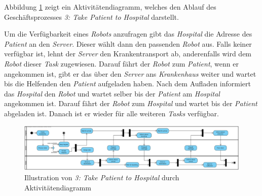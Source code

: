 			Abbildung \ref{fig:2-4-take-patient-to-hospital-aktivitaetendiagramm} zeigt ein Aktivitätendiagramm, welches den Ablauf des Geschäftsprozesses \emph{3: Take Patient to Hospital} darstellt.

			Um die Verfügbarkeit eines \emph{Robots} anzufragen gibt das \emph{Hospital} die Adresse des \emph{Patient} an den \emph{Server}. 
			Dieser wählt dann den passenden \emph{Robot} aus. 
			Falls keiner verfügbar ist, lehnt der \emph{Server} den Krankentransport ab, anderenfalls wird dem \emph{Robot} dieser \emph{Task} zugewiesen. 
			Darauf fährt der \emph{Robot} zum \emph{Patient}, wenn er angekommen ist, gibt er das über den \emph{Server} ans \emph{Krankenhaus} weiter und wartet bis die Helfenden den \emph{Patient} aufgeladen haben. 
			Nach dem Aufladen informiert das \emph{Hospital} den \emph{Robot} und wartet selber bis der \emph{Patient} am \emph{Hospital} angekommen ist. 
			Darauf fährt der \emph{Robot} zum \emph{Hospital} und wartet bis der \emph{Patient} abgeladen ist. 
			Danach ist er wieder für alle weiteren \emph{Tasks} verfügbar.
			
			\begin{figure}[H]
				\centering
				\includegraphics[width=1.4\textwidth, angle=90]{img/1-Analyse-2-Geschaeftsprozess_TakePatientToHospital}
				\caption{Illustration von \emph{3: Take Patient to Hospital} durch Aktivitätendiagramm}
				\label{fig:2-4-take-patient-to-hospital-aktivitaetendiagramm}
			\end{figure}
	\pagebreak

	
